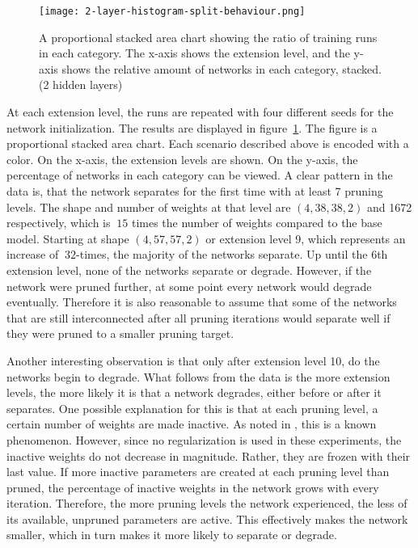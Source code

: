 \begin{figure}[ht] %
    \centering
    \texttt{[image: 2-layer-histogram-split-behaviour.png]}
    \caption[Separation/Degradation Stacked Area Chart (2 hidden layers)]{
        A proportional stacked area chart showing the ratio of training runs in each category.
        The x-axis shows the extension level, and the y-axis shows the relative amount of networks in each category, stacked. (2 hidden layers)
        }\label{fig:2laxer-histogram}
\end{figure}

At each extension level, the runs are repeated with four different seeds for the network initialization.
The results are displayed in figure~\ref{fig:2laxer-histogram}.
The figure is a proportional stacked area chart.
Each scenario described above is encoded with a color.
On the x-axis, the extension levels are shown.
On the y-axis, the percentage of networks in each category can be viewed.
A clear pattern in the data is, that the network separates for the first time with at least 7 pruning levels.
The shape and number of weights at that level are $(4,38,38,2)$ and 1672 respectively, which is $~15$ times the number of weights compared to the base model. 
Starting at shape $(4,57,57,2)$ or extension level 9, which represents an increase of $~32$-times, the majority of the networks separate.
Up until the 6th extension level, none of the networks separate or degrade. 
However, if the network were pruned further, at some point every network would degrade eventually.
Therefore it is also reasonable to assume that some of the networks that are still interconnected after all pruning iterations would separate well if they were pruned to a smaller pruning target.

Another interesting observation is that only after extension level 10, do the networks begin to degrade.
What follows from the data is the more extension levels, the more likely it is that a network degrades, either before or after it separates.
One possible explanation for this is that at each pruning level, a certain number of weights are made inactive.
As noted in \autocite{HanEtAl15, AllAlivePruning}, this is a known phenomenon.
However, since no regularization is used in these experiments, the inactive weights do not decrease in magnitude.
Rather, they are frozen with their last value.
If more inactive parameters are created at each pruning level than pruned, the percentage of inactive weights in the network grows with every iteration.
Therefore, the more pruning levels the network experienced, the less of its available, unpruned parameters are active.
This effectively makes the network smaller, which in turn makes it more likely to separate or degrade.

